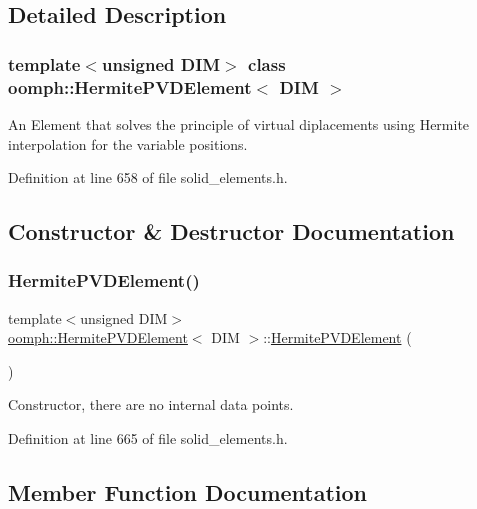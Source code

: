 \subsection{Detailed Description}
\subsubsection*{template$<$unsigned D\+IM$>$\newline
class oomph\+::\+Hermite\+P\+V\+D\+Element$<$ D\+I\+M $>$}

An Element that solves the principle of virtual diplacements using Hermite interpolation for the variable positions. 

Definition at line 658 of file solid\+\_\+elements.\+h.



\subsection{Constructor \& Destructor Documentation}
\mbox{\label{classoomph_1_1HermitePVDElement_abfa0fec4ed71f1599c9d5e925ad5ce2d}} 
\subsubsection{\texorpdfstring{Hermite\+P\+V\+D\+Element()}{HermitePVDElement()}}
{\footnotesize\ttfamily template$<$unsigned D\+IM$>$ \\
\hyperlink{classoomph_1_1HermitePVDElement}{oomph\+::\+Hermite\+P\+V\+D\+Element}$<$ D\+IM $>$\+::\hyperlink{classoomph_1_1HermitePVDElement}{Hermite\+P\+V\+D\+Element} (\begin{DoxyParamCaption}{ }\end{DoxyParamCaption})\hspace{0.3cm}{\ttfamily [inline]}}



Constructor, there are no internal data points. 



Definition at line 665 of file solid\+\_\+elements.\+h.



\subsection{Member Function Documentation}
\mbox{\label{classoomph_1_1HermitePVDElement_aa0e10a14a3b005e07d74c9fa99e47d48}} 
